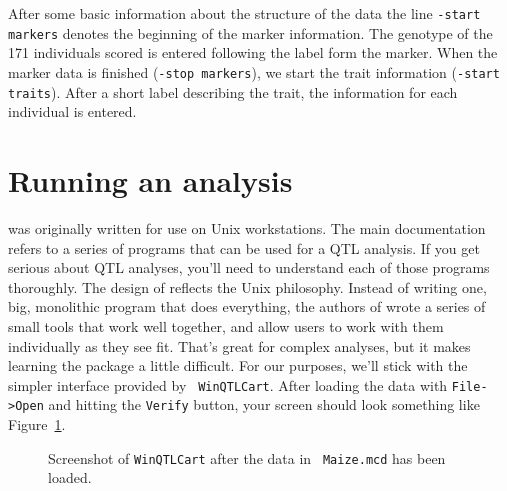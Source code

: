 After some basic information about the structure of the data the line
{\tt -start markers} denotes the beginning of the marker
information. The genotype of the 171 individuals scored is entered
following the label form the marker. When the marker data is finished
({\tt -stop markers}), we start the trait information ({\tt -start
traits}). After a short label describing the trait, the information
for each individual is entered.

\section*{Running an analysis}

\qtl{} was originally written for use on Unix workstations. The main
documentation refers to a series of programs that can be used for a
QTL analysis. If you get serious about QTL analyses, you'll need to
understand each of those programs thoroughly. The design of \qtl{}
reflects the Unix philosophy. Instead of writing one, big, monolithic
program that does everything, the authors of \qtl{} wrote a series of
small tools that work well together, and allow users to work with them
individually as they see fit. That's great for complex analyses, but
it makes learning the package a little difficult. For our purposes,
we'll stick with the simpler interface provided by {\tt
  WinQTLCart}. After loading the data with {\tt File->Open} and
hitting the {\tt Verify} button, your screen should look something
like Figure~\ref{fig:qtl-data-loaded}.

\begin{figure}
\begin{center}
\end{center}
\caption{Screenshot of {\tt WinQTLCart} after the data in {\tt
    Maize.mcd} has been loaded.}\label{fig:qtl-data-loaded}
\end{figure}

